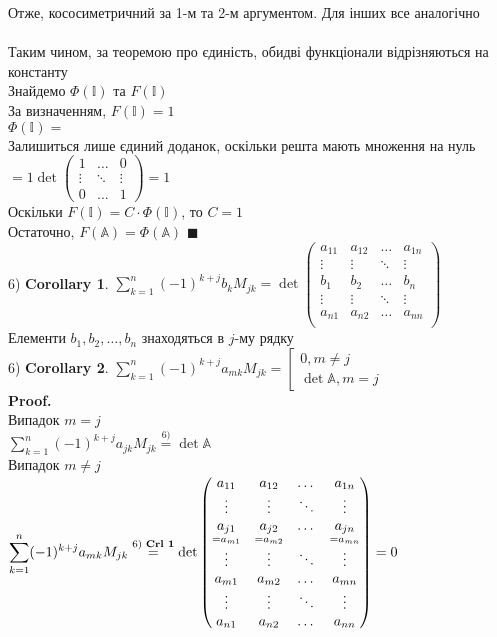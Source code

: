 \documentclass[a4paper, 14pt]{extarticle}
\def\huge{\displaystyle}
\def\proof{\textbf{Proof.}\\}
\def\bigline{\vspace{5mm}\\}
\def\qed{$\blacksquare$}
\begin{document}
Отже, кососиметричний за 1-м та 2-м аргументом. Для інших все аналогічно\\
\\
Таким чином, за теоремою про єдиність, обидві функціонали відрізняються на константу\\
Знайдемо $\Phi(\mathbb{I})$ та $F(\mathbb{I})$\\
За визначенням, $F(\mathbb{I}) = 1$\\
$\Phi(\mathbb{I}) =$\\
Залишиться лише єдиний доданок, оскільки решта мають множення на нуль\\
$= 1 \det \begin{pmatrix} 1 & \dots & 0 \\ \vdots & \ddots & \vdots \\ 0 & \dots & 1 \end{pmatrix} = 1$\\
Оскільки $F(\mathbb{I}) = C\cdot \Phi(\mathbb{I})$, то $C = 1$\\
Остаточно, $F(\mathbb{A}) = \Phi(\mathbb{A})$ \qed
\bigline
6) \textbf{Corollary 1}. $\huge\sum_{k=1}^n (-1)^{k+j} b_k M_{jk} = \det \begin{pmatrix}
a_{11} & a_{12} & \dots & a_{1n} \\
\vdots & \vdots & \ddots & \vdots \\
b_1 & b_2 & \dots & b_n \\
\vdots & \vdots & \ddots & \vdots \\
a_{n1} & a_{n2} & \dots & a_{nn} \\
\end{pmatrix}$\\
Елементи $b_1,b_2,\dots,b_n$ знаходяться в $j$-му рядку
\bigline
6) \textbf{Corollary 2}. $\huge \sum_{k=1}^n (-1)^{k+j} a_{mk}M_{jk} = \left[\begin{gathered} 0, m \neq j \\ \det \mathbb{A}, m = j \end{gathered} \right.$\\
\proof
Випадок $m = j$\\
$\huge \sum_{k=1}^n (-1)^{k+j} a_{jk} M_{jk} \overset{\textrm{6)}}{=} \det \mathbb{A}$\\
Випадок $m \neq j$\\
$\huge \sum_{k=1}^n (-1)^{k+j} a_{mk} M_{jk} \overset{\textrm{6) \textbf{Crl 1}}}{=} \det \begin{pmatrix}
a_{11} & a_{12} & \dots & a_{1n} \\
\vdots & \vdots & \ddots & \vdots \\
\underset{=a_{m1}}{a_{j1}} & \underset{=a_{m2}}{a_{j2}} & \dots & \underset{=a_{mn}}{a_{jn}} \\
\vdots & \vdots & \ddots & \vdots \\
a_{m1} & a_{m2} & \dots & a_{mn} \\
\vdots & \vdots & \ddots & \vdots \\
a_{n1} & a_{n2} & \dots & a_{nn}
\end{pmatrix} = 0$\\
\end{document}
